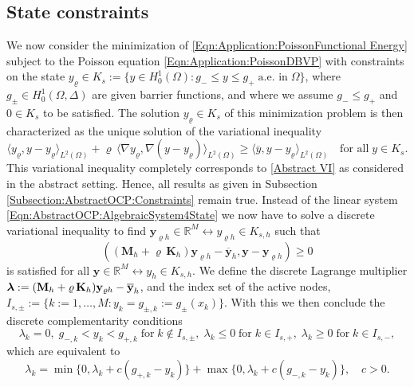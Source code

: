 \documentclass{article}
\numberwithin{equation}{section}
\begin{document}
\subsection{State constraints}
\label{Subsection:Application:EnergyRegularisation:Constraints}
We now consider the minimization of
\eqref{Eqn:Application:PoissonFunctional Energy} subject to the
Poisson equation \eqref{Eqn:Application:PoissonDBVP} with
constraints on the state
$y_\varrho \in K_s := \{ y \in H^1_0(\Omega) : g_- \leq y \leq g_+ \;
\mbox{a.e. in} \; \Omega \}$,
where $g_\pm \in H^1_0(\Omega,\Delta)$ are given barrier functions, and
where we assume $g_- \leq g_+$ and $0 \in K_s$ to be satisfied.
The solution $y_\varrho \in K_s$ of this minimization problem
is then characterized as the unique solution of the variational
inequality
\begin{equation}
  \langle y_\varrho , y-y_\varrho \rangle_{L^2(\Omega)} + \varrho \,
  \langle \nabla y_\varrho , \nabla (y-y_\varrho) \rangle_{L^2(\Omega)}
  \geq \langle \overline{y}, y-y_\varrho \rangle_{L^2(\Omega)}
  \quad \mbox{for all} \; y \in K_s .
\end{equation}
This variational inequality completely corresponds to \eqref{Abstract VI}
as considered in the abstract setting. Hence, all results as given in
Subsection \ref{Subsection:AbstractOCP:Constraints} remain true.
Instead of the linear system \eqref{Eqn:AbstractOCP:AlgebraicSystem4State}
we now have to solve a discrete variational inequality to find
${\mathbf y}_{\varrho h} \in {\mathbb{R}}^M \leftrightarrow
y_{\varrho h} \in K_{s,h}$ such that
\begin{equation}
\label{Eqn:AbstractOCP:DiscreteVariationalInequality4StateConstraints}
  (({\mathbf M}_h + \varrho \, {\mathbf K}_h) {\mathbf y}_{\varrho h} -
  \overline{\mathbf y}_h, {\mathbf{y}-{\mathbf{y}_{\varrho h}}}) \geq 0
\end{equation}
is satisfied for all ${\mathbf y} \in {\mathbb{R}}^M \leftrightarrow
y_h \in K_{s,h}$. We define the discrete Lagrange multiplier
$\mbox{\boldmath $\lambda$} :=
({\mathbf M}_h + \varrho \, {\mathbf K}_h) {\mathbf y}_{\varrho h} -
\overline{\mathbf y}_h$, and the index set of the active nodes,
$I_{s,\pm} := \{ k:=1,\ldots,M: y_k = g_{\pm,k} := g_\pm(x_k)\}$. With this
we then conclude the discrete complementarity conditions
\[
  \lambda_k = 0, \;
  g_{-,k} < y_k < g_{+,k} \; \mbox{for} \; k \not\in I_{s,\pm}, \;
  \lambda_k \leq 0 \; \mbox{for} \; k \in I_{s,+}, \;
  \lambda_k \geq 0 \; \mbox{for} \; k \in I_{s,-},
\]
which are equivalent to
\[
  \lambda_k = \min \{ 0 , \lambda_k + c (g_{+,k}-y_k) \} +
  \max \{ 0 , \lambda_k + c (g_{-,k}-y_k) \}, \quad c > 0.
\]
\end{document}
